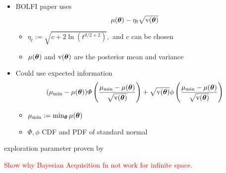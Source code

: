 \begin{itemize}
    \item BOLFI paper uses $$\mu(\bm{\theta}) - \eta_t\sqrt{\mathrm{v}(\bm{\theta})}$$ \begin{itemize}
              \item $\eta_t:= \sqrt{c + 2\ln(t^{d/2 + 2})},$ and $c$ can be chosen
              \item $\mu(\bm{\theta})$ and $\mathrm{v}(\bm{\theta})$ are the posterior mean and variance
          \end{itemize}

    \item Could use expected information
          $$
              (\mu_\text{min} - \mu(\bm{\theta})) \varPhi \left(
              \frac{\mu_\text{min} - \mu(\bm{\theta})}{\sqrt{\mathrm{v}(\bm{\theta})}}
              \right)
              + \sqrt{\mathrm{v}(\bm{\theta})}\phi\left(
              \frac{\mu_\text{min} - \mu(\bm{\theta})}{\sqrt{\mathrm{v}(\bm{\theta})}}
              \right)
          $$
          \begin{itemize}
              \item $\mu_\text{min} := \min_{\bm{\theta}} \mu(\bm{\theta})$
              \item $\varPhi, \phi$ CDF and PDF of standard normal
          \end{itemize}
\end{itemize}
exploration parameter proven by \cite{srinivas_gaussian_2010}

\textcolor{red}{Show why Bayesian Acquisition fn not work for infinite space.}
